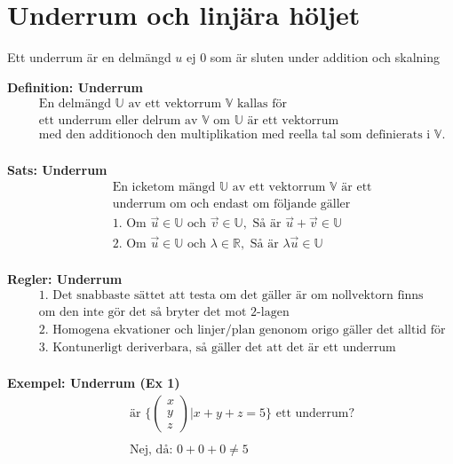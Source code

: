 \newpage

\section{Underrum och linjära höljet}
Ett underrum är en delmängd $u$ ej $0$ som är sluten under addition och skalning

\textbf{Definition: Underrum}
\begin{align*}
  &\quad  \text{En delmängd $\mathbb{U}$ av ett vektorrum $\mathbb{V}$ kallas för } \\
  &\quad  \text{ett underrum eller delrum av $\mathbb{V}$ om $\mathbb{U}$ är ett vektorrum} \\
  &\quad  \text{med den additionoch den multiplikation med reella tal som definierats i
    $\mathbb{V}$.} \\
\end{align*}

\textbf{Sats: Underrum}
\begin{align*}
  &\quad  \text{En icketom mängd $\mathbb{U}$ av ett vektorrum $\mathbb{V}$ är ett} \\
  &\quad  \text{underrum om och endast om följande gäller} \\
  &\quad  \text{1. Om } \vec{u}\in\mathbb{U} \text{ och } \vec{v}\in\mathbb{U},
  \text{ Så är } \vec{u}+\vec{v} \in\mathbb{U} \\
  &\quad  \text{2. Om } \vec{u}\in\mathbb{U} \text{ och } \lambda\in\mathbb{R},
  \text{ Så är } \lambda\vec{u} \in\mathbb{U} \\
\end{align*}

\textbf{Regler: Underrum}
\begin{align*}
  &\quad  \text{1. Det snabbaste sättet att testa om det gäller är om nollvektorn finns} \\
  &\quad  \text{om den inte gör det så bryter det mot 2-lagen} \\
  &\quad  \text{2. Homogena ekvationer och linjer/plan genonom origo gäller det alltid för} \\
  &\quad  \text{3. Kontunerligt deriverbara, så gäller det att det är ett underrum} \\
\end{align*}

\textbf{Exempel: Underrum (Ex 1)}
\begin{align*}
  &\quad  \text{är } \Big\{ \begin{pmatrix} x \\ y \\ z \end{pmatrix} | x+y+z=5 \Big\}
  \text{ ett underrum?} \\
  &\quad  \\
  &\quad  \text{Nej, då: } 0+0+0\neq5 \\
\end{align*} %


